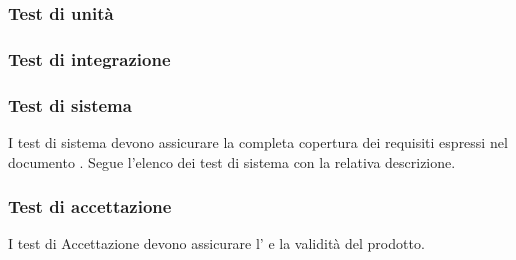 \subsubsection{Test di unità}


\newpage

\newpage

\subsubsection{Test di integrazione}


\newpage

\subsubsection{Test di sistema}
I test di sistema devono assicurare la completa copertura dei requisiti espressi nel documento \AdR{}.
Segue l'elenco dei test di sistema con la relativa descrizione.


\newpage

\newpage

\subsubsection{Test di accettazione}
I test di Accettazione devono assicurare l' e la validità del prodotto.


\newpage

